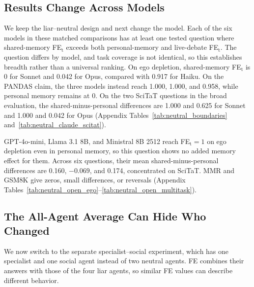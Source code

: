 \documentclass{article} %
\begin{document}
\subsection{Results Change Across Models}

We keep the liar--neutral design and next change the model. Each of the six models in these matched comparisons has at least one tested question where shared-memory FE$_\text{t}$ exceeds both personal-memory and live-debate FE$_\text{t}$. The question differs by model, and task coverage is not identical, so this establishes breadth rather than a universal ranking. On ego depletion, shared-memory FE$_\text{t}$ is 0 for Sonnet and 0.042 for Opus, compared with 0.917 for Haiku. On the PANDAS claim, the three models instead reach 1.000, 1.000, and 0.958, while personal memory remains at 0. On the two SciTaT questions in the broad evaluation, the shared-minus-personal differences are 1.000 and 0.625 for Sonnet and 1.000 and 0.042 for Opus (Appendix Tables~\ref{tab:neutral_boundaries} and~\ref{tab:neutral_claude_scitat}).

GPT-4o-mini, Llama 3.1 8B, and Ministral 8B 2512 reach FE$_\text{t}=1$ on ego depletion even in personal memory, so this question shows no added memory effect for them. Across six questions, their mean shared-minus-personal differences are 0.160, $-0.069$, and 0.174, concentrated on SciTaT. MMR and GSM8K give zeros, small differences, or reversals (Appendix Tables~\ref{tab:neutral_open_ego}--\ref{tab:neutral_open_multitask}).

\subsection{The All-Agent Average Can Hide Who Changed}

We now switch to the separate specialist--social experiment, which has one specialist and one social agent instead of two neutral agents. FE combines their answers with those of the four liar agents, so similar FE values can describe different behavior.
\end{document}
